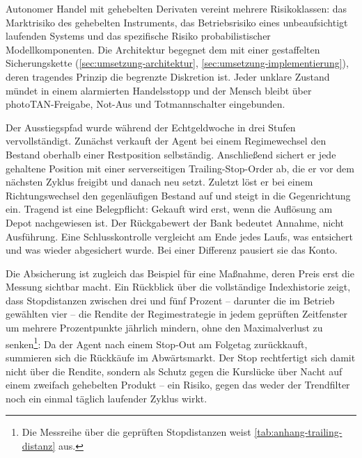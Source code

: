 Autonomer Handel mit gehebelten Derivaten vereint mehrere Risikoklassen: das Marktrisiko des
gehebelten Instruments, das Betriebsrisiko eines unbeaufsichtigt laufenden Systems und das
spezifische Risiko probabilistischer Modellkomponenten. Die Architektur begegnet dem mit
einer gestaffelten Sicherungskette (\cref{sec:umsetzung-architektur},
\cref{sec:umsetzung-implementierung}), deren tragendes Prinzip die begrenzte Diskretion ist.
Jeder unklare Zustand mündet in einem alarmierten Handelsstopp und der Mensch bleibt über
photoTAN-Freigabe, Not-Aus und Totmannschalter eingebunden.

Der Ausstiegspfad wurde während der Echtgeldwoche in drei Stufen vervollständigt. Zunächst
verkauft der Agent bei einem Regimewechsel den Bestand oberhalb einer Restposition
selbständig. Anschließend sichert er jede gehaltene Position mit einer serverseitigen
Trailing-Stop-Order ab, die er vor dem nächsten Zyklus freigibt und danach neu setzt.
Zuletzt löst er bei einem Richtungswechsel den gegenläufigen Bestand auf und steigt in die
Gegenrichtung ein. Tragend ist eine Belegpflicht: Gekauft wird erst, wenn die
Auflösung am Depot nachgewiesen ist. Der Rückgabewert der Bank bedeutet Annahme, nicht
Ausführung. Eine Schlusskontrolle vergleicht am Ende jedes Laufs, was entsichert und was
wieder abgesichert wurde. Bei einer Differenz pausiert sie das Konto.

Die Absicherung ist zugleich das Beispiel für eine Maßnahme, deren Preis erst die Messung
sichtbar macht. Ein Rückblick über die vollständige Indexhistorie zeigt, dass Stopdistanzen
zwischen drei und fünf Prozent -- darunter die im Betrieb gewählten vier -- die Rendite
der Regimestrategie in jedem geprüften Zeitfenster um mehrere Prozentpunkte jährlich
mindern, ohne den Maximalverlust zu senken\footnote{Die Messreihe über die geprüften
Stopdistanzen weist \cref{tab:anhang-trailing-distanz} aus.}: Da der Agent nach einem Stop-Out am Folgetag
zurückkauft, summieren sich die Rückkäufe im Abwärtsmarkt. Der Stop rechtfertigt sich damit
nicht über die Rendite, sondern als Schutz gegen die Kurslücke über Nacht auf einem zweifach
gehebelten Produkt -- ein Risiko, gegen das weder der Trendfilter noch ein einmal täglich
laufender Zyklus wirkt.

